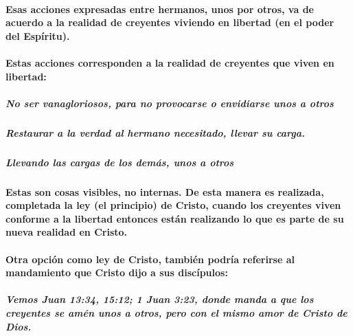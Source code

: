 \documentclass[11a pt,twoside]{article}
\let\oldparagraph\paragraph
\renewcommand{\paragraph}{\needspace{3\baselineskip}\oldparagraph}
\let\oldsubparagraph\subparagraph
\renewcommand{\subparagraph}{\needspace{2\baselineskip}\oldsubparagraph}
\begin{document}
\paragraph{Esas acciones expresadas entre hermanos, unos por otros, va
de acuerdo a la realidad de creyentes viviendo en libertad (en el poder
del
Espíritu).}\label{esas-acciones-expresadas-entre-hermanos-unos-por-otros-va-de-acuerdo-a-la-realidad-de-creyentes-viviendo-en-libertad-en-el-poder-del-espuxedritu.}

\paragraph{Estas acciones corresponden a la realidad de creyentes que
viven en
libertad:}\label{estas-acciones-corresponden-a-la-realidad-de-creyentes-que-viven-en-libertad}

\subparagraph{No ser vanagloriosos, para no provocarse o envidiarse unos
a
otros}\label{no-ser-vanagloriosos-para-no-provocarse-o-envidiarse-unos-a-otros}

\subparagraph{Restaurar a la verdad al hermano necesitado, llevar su
carga.}\label{restaurar-a-la-verdad-al-hermano-necesitado-llevar-su-carga.}

\subparagraph{Llevando las cargas de los demás, unos a
otros}\label{llevando-las-cargas-de-los-demuxe1s-unos-a-otros}

\paragraph{Estas son cosas visibles, no internas. De esta manera es
realizada, completada la ley (el principio) de Cristo, cuando los
creyentes viven conforme a la libertad entonces están realizando lo que
es parte de su nueva realidad en
Cristo.}\label{estas-son-cosas-visibles-no-internas.-de-esta-manera-es-realizada-completada-la-ley-el-principio-de-cristo-cuando-los-creyentes-viven-conforme-a-la-libertad-entonces-estuxe1n-realizando-lo-que-es-parte-de-su-nueva-realidad-en-cristo.}

\paragraph{Otra opción como ley de Cristo, también podría referirse al
mandamiento que Cristo dijo a sus
discípulos:}\label{otra-opciuxf3n-como-ley-de-cristo-tambiuxe9n-podruxeda-referirse-al-mandamiento-que-cristo-dijo-a-sus-discuxedpulos}

\subparagraph{Vemos Juan 13:34, 15:12; 1 Juan 3:23, donde manda a que
los creyentes se amén unos a otros, pero con el mismo amor de Cristo de
Dios.}\label{vemos-juan-1334-1512-1-juan-323-donde-manda-a-que-los-creyentes-se-amuxe9n-unos-a-otros-pero-con-el-mismo-amor-de-cristo-de-dios.}
\end{document}
